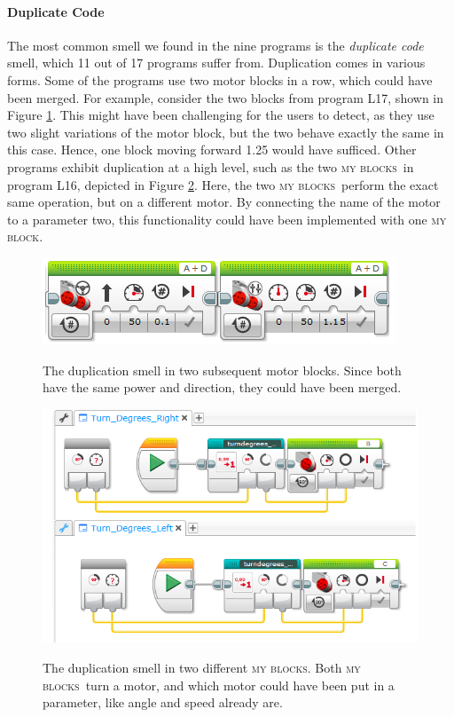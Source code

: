 \documentclass{sig-alternate}
\newcommand{\mbs}{\textsc{my blocks}}
\newcommand{\mb}{\textsc{my block}}
\begin{document}
\paragraph{Duplicate Code}
The most common smell we found in the nine programs is the \emph{duplicate code} smell, which 11 out of 17 programs suffer from. Duplication comes in various forms.  Some of the programs use two motor blocks in a row, which could have been merged. For example, consider the two blocks from program L17, shown in Figure \ref{fig:dup_ev3}. This might have been challenging for the users to detect, as they use two slight variations of the motor block, but the two behave exactly the same in this case. Hence, one block moving forward 1.25 would have sufficed. Other programs exhibit duplication at a high level, such as the two \mbs~in program L16, depicted in Figure \ref{fig:dup_ev3_myblocks}. Here, the two \mbs~perform the exact same operation, but on a different motor. By connecting the name of the motor to a parameter two, this functionality could have been implemented with one \mb.

\begin{figure} [tb]
\caption{The duplication smell in two subsequent motor blocks. Since both have the same power and direction, they could have been merged. }
\centering
\includegraphics[width=\columnwidth]{img/dup_ev3}
\label{fig:dup_ev3}
\end{figure}

\begin{figure} [tb]
\caption{The duplication smell in two different \mbs. Both \mbs~turn a motor, and which motor could have been put in a parameter, like angle and speed already are. }
\centering
\includegraphics[width=\columnwidth]{img/dup_ev3_myblocks}
\label{fig:dup_ev3_myblocks}
\end{figure}
\end{document}
